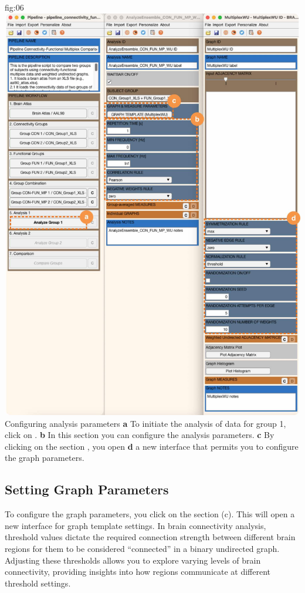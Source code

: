 \documentclass[justified]{tufte-handout}
\begin{document}
	{fig:06}
	{
	\includegraphics{fig06.jpg}
	}
	{Configuring analysis parameters}
	{
	{\bf a} To initiate the analysis of data for group 1, click on .
 	{\bf b} In this section you can configure the analysis parameters.
 	{\bf c} By clicking on the section , you open {\bf d} a new interface that permits you to configure the graph parameters.
	}
 
\subsection{Setting Graph Parameters}

To configure the graph parameters, you click on the section  (c). This will open a new interface for graph template settings. 
In brain connectivity analysis, threshold values dictate the required connection strength between different brain regions for them to be considered “connected” in a binary undirected graph. 
Adjusting these thresholds allows you to explore varying levels of brain connectivity, providing insights into how regions communicate at different threshold settings.
\end{document}
